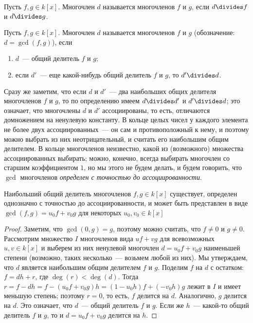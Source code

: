 \begin{definition}
Пусть $f,g\in k[x]$. Многочлен $d$ называется 
многочленов $f$ и $g$, если $d\divides f$ и $d\divides g$.
\end{definition}

\begin{definition}
Пусть $f,g\in k[x]$. Многочлен $d$ называется  многочленов
$f$ и $g$ (обозначение: $d=\gcd(f,g)$), если
\begin{enumerate}
\item $d$~--- общий делитель $f$ и $g$;
\item если $d'$~--- еще какой-нибудь общий делитель $f$ и $g$, то
  $d'\divides d$.
\end{enumerate}
\end{definition}

\begin{remark}
Сразу же заметим, что если $d$ и $d'$~--- два наибольших общих
делителя многочленов $f$ и $g$, то по определению имеем $d\divides d'$ и
$d'\divides d$; это означает, что многочлены $d$ и $d'$ ассоциированы, то
есть, отличаются домножением на ненулевую константу. В кольце целых
чисел у каждого элемента не более двух ассоциированных~--- он сам и
противоположный к нему, и поэтому можно выбрать из них
неотрицательный, и считать его наибольшим общим делителем. В кольце
многочленов неизвестно, какой из (возможного) множества
ассоциированных выбирать;
можно, конечно, всегда выбирать многочлен со старшим коэффициентом
$1$, но мы этого не будем делать, и будем говорить, что $\gcd$
многочленов {\em определен с точностью до ассоциированности}.
\end{remark}


\begin{theorem}\label{thm_gcd_polynomials}
Наибольший общий делитель многочленов $f,g\in k[x]$ существует,
определен однозначно с точностью до ассоциированности, и может быть
представлен в виде
$\gcd(f,g)=u_0f+v_0g$ для некоторых $u_0,v_0\in k[x]$
\end{theorem}
\begin{proof}
Заметим, что $\gcd(0,g)=g$, поэтому можно считать, что $f\neq 0$ и
$g\neq 0$. Рассмотрим множество $I$ многочленов вида $uf+vg$ для
всевозможных $u,v\in k[x]$ и выберем из них ненулевой многочлен
$d=u_0f+v_0g$ наименьшей степени (возможно, таких несколько~---
возьмем любой из
них). Мы утверждаем, что $d$ является наибольшим общим делителем $f$ и
$g$. Поделим $f$ на $d$ с остатком: $f=dh+r$, где
$\deg(r)<\deg(d)$. Тогда $r=f-dh=f-(u_0f+v_0g)h=(1-u_0h)f+(-v_0h)g$
лежит в $I$ и имеет меньшую степень; поэтому $r=0$, то есть, $f$
делится на $d$. Аналогично, $g$ делится на $d$. Это означает, что
$d$~--- общий делитель $f$ и $g$. Если же $h$~--- какой-то общий
делитель $f$ и $g$, то и $d=u_0f+v_0g$ делится на $h$.
\end{proof}

